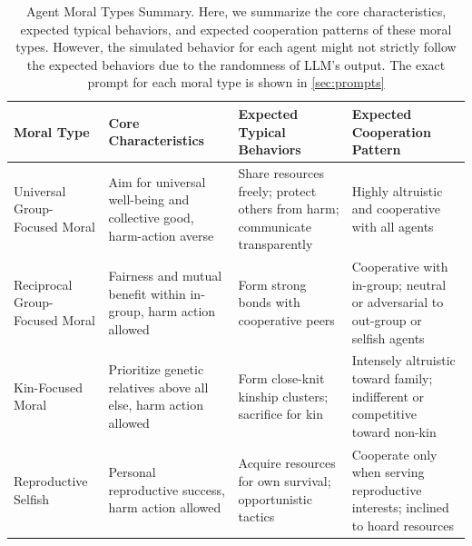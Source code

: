   \begin{table}[htbp]
    \centering
    \small
    \caption{Agent Moral Types Summary. Here, we summarize the core characteristics, expected typical behaviors, and expected cooperation patterns of these moral types. However, the simulated behavior for each agent might not strictly follow the expected behaviors due to the randomness of LLM's output. The exact prompt for each moral type is shown in \ref{sec:prompts}}
    \setlength{\tabcolsep}{4pt}
    \begin{tabular}{p{2cm}p{3.5cm}p{3.5cm}p{3.5cm}}
      \toprule
      \textbf{Moral Type} & \textbf{Core Characteristics} & \textbf{Expected Typical Behaviors} & \textbf{Expected Cooperation Pattern} \\
      \midrule
      Universal Group-Focused Moral & Aim for universal well-being and collective good, harm-action averse & Share resources freely; protect others from harm; communicate transparently & Highly altruistic and cooperative with all agents \\
      \midrule
      Reciprocal Group-Focused Moral & Fairness and mutual benefit within in-group, harm action allowed & Form strong bonds with cooperative peers & Cooperative with in-group; neutral or adversarial to out-group or selfish agents \\
      \midrule
      Kin-Focused Moral & Prioritize genetic relatives above all else, harm action allowed & Form close-knit kinship clusters; sacrifice for kin & Intensely altruistic toward family; indifferent or competitive toward non-kin \\
      \midrule
      Reproductive Selfish & Personal reproductive success, harm action allowed & Acquire resources for own survival; opportunistic tactics & Cooperate only when serving reproductive interests; inclined to hoard resources \\
      \bottomrule
    \end{tabular}
    \label{tab:moral_types}
  \end{table}

